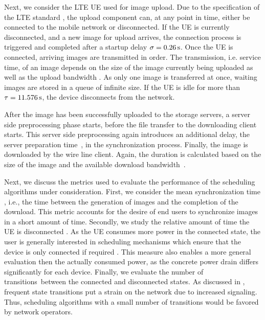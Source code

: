 Next, we consider the \gls{LTE} \gls{UE} used for image upload.
Due to the specification of the \gls{LTE} standard \cite{3GPP_RRC_Spec}, the upload component can, at any point in time, either be connected to the mobile network or disconnected.
If the \gls{UE} is currently disconnected, and a new image for upload arrives, the connection process is triggered and completed after a startup delay \(\sigma = \SI{0.26}{\second}\).
Once the \gls{UE} is connected, arriving images are transmitted in order.
The transmission, i.e. service time, of an image depends on the size of the image currently being uploaded as well as the upload bandwidth \uploadbandwidth.
As only one image is transferred at once, waiting images are stored in a queue of infinite size.
If the \gls{UE} is idle for more than \(\tau = \SI{11.576}{\second}\), the device disconnects from the network.

After the image has been successfully uploaded to the storage servers, a server side preprocessing phase starts, before the file transfer to the downloading client starts.
This server side preprocessing again introduces an additional delay, the server preparation time~\serverpreparationtime, in the synchronization process.
Finally, the image is downloaded by the wire line client.
Again, the duration is calculated based on the size of the image and the available download bandwidth~\downloadbandwidth.

Next, we discuss the metrics used to evaluate the performance of the scheduling algorithms under consideration.
First, we consider the mean synchronization time \sojournTime, i.e., the time between the generation of images and the completion of the download.
This metric accounts for the desire of end users to synchronize images in a short amount of time.
Secondly, we study the relative amount of time the \gls{UE} is disconnected \relativeDisconnectedTime.
As the \gls{UE} consumes more power in the connected state, the user is generally interested in scheduling mechanisms which ensure that the device is only connected if required \cite{Ickin2012}.
This measure also enables a more general evaluation then the actually consumed power, as the concrete power drain differs significantly for each device.
Finally, we evaluate the number of transitions~\connectionCount between the connected and disconnected states.
As discussed in , frequent state transitions put a strain on the network due to increased signaling.
Thus, scheduling algorithms with a small number of transitions would be favored by network operators.

